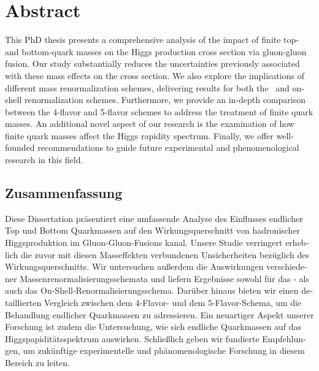 \begingroup
\let\clearpage\relax
\let\cleardoublepage\relax
\let\cleardoublepage\relax
\chapter*{Abstract}

This PhD thesis presents a comprehensive analysis of the impact of finite top- and bottom-quark masses on the Higgs production cross section via gluon-gluon fusion. Our study substantially reduces the uncertainties previously associated with these mass effects on the cross section. We also explore the implications of different mass renormalization schemes, delivering results for both the \MS\ and on-shell renormalization schemes. Furthermore, we provide an in-depth comparison between the 4-flavor and 5-flavor schemes to address the treatment of finite quark masses. An additional novel aspect of our research is the examination of how finite quark masses affect the Higgs rapidity spectrum. Finally, we offer well-founded recommendations to guide future experimental and phenomenological research in this field.

\newpage
\begin{otherlanguage}{ngerman}
\chapter*{Zusammenfassung}
Diese Dissertation präsentiert eine umfassende Analyse des Einflusses endlicher Top und Bottom Quarkmassen auf den Wirkungsquerschnitt von hadronischer Higgsproduktion im Gluon-Gluon-Fusions kanal. Unsere Studie verringert erheblich die zuvor mit diesen Masseffekten verbundenen Unsicherheiten bezüglich des Wirkungsquerschnitts. Wir untersuchen außerdem die Auswirkungen verschiedener Massenrenormalisierungsschemata und liefern Ergebnisse sowohl für das \MS- als auch das On-Shell-Renormalisierungsschema. Darüber hinaus bieten wir einen detaillierten Vergleich zwischen dem 4-Flavor- und dem 5-Flavor-Schema, um die Behandlung endlicher Quarkmassen zu adressieren. Ein neuartiger Aspekt unserer Forschung ist zudem die Untersuchung, wie sich endliche Quarkmassen auf das Higgspapiditätsspektrum auswirken. Schließlich geben wir fundierte Empfehlungen, um zukünftige experimentelle und phänomenologische Forschung in diesem Bereich zu leiten.

\end{otherlanguage}

\endgroup

\vfill
